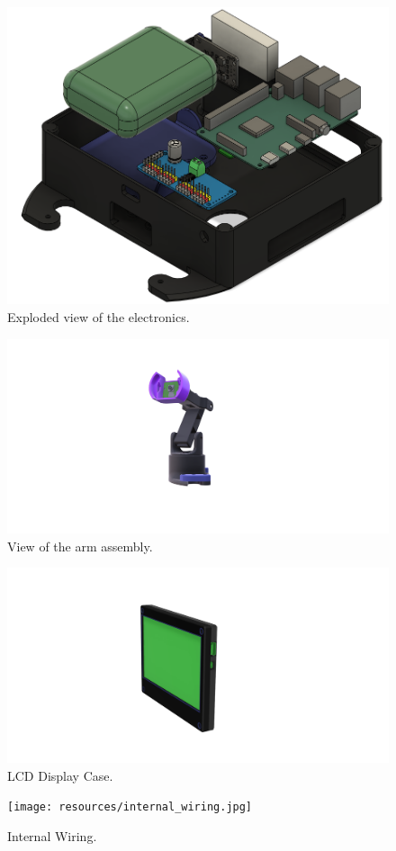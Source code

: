     \begin{figure}[h]
        \centering
        \includegraphics[width = \textwidth]{resources/altview3.png}
        \caption{Exploded view of the electronics.}
        \label{fig:exploded_view}
      \end{figure}
      \begin{figure}[h]
          \centering
          \includegraphics[width = \textwidth]{resources/arm_assembly.png}
          \caption{View of the arm assembly.}
          \label{fig:arm_assembly}
        \end{figure}
        \begin{figure}[h]
            \centering
            \includegraphics[width = \textwidth]{resources/LCD_case.png}
            \caption{LCD Display Case.}
            \label{fig:LCD_Case}
          \end{figure}
          \begin{figure}[h]
              \centering
              \texttt{[image: resources/internal\_wiring.jpg]}
              \caption{Internal Wiring.}
              \label{fig:internal_wiring}
            \end{figure}